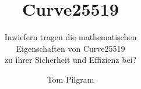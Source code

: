 \documentclass[aspectratio=169]{beamer}
\title{Curve25519}
\subtitle{Inwiefern tragen die mathematischen \\ Eigenschaften von Curve25519 \\ zu ihrer Sicherheit und Effizienz bei?}
\author{Tom Pilgram}
\institute{April 2025}
\date{}
\begin{document}
\begin{frame}
    \maketitle
\end{frame}



%















\end{document}
